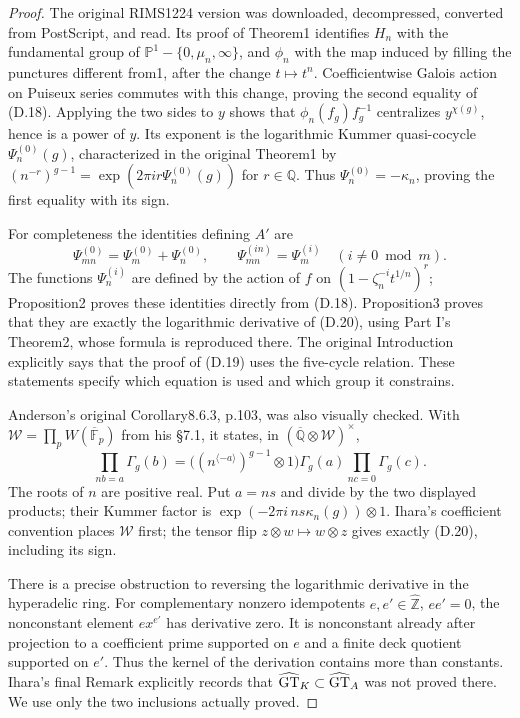 \begin{proof}
The original RIMS1224 version was downloaded, decompressed, converted from PostScript, and read. Its proof of Theorem1 identifies $H_n$ with the fundamental group of $\mathbb P^1-\{0,\mu_n,\infty\}$, and $\phi_n$ with the map induced by filling the punctures different from1, after the change $t\mapsto t^n$. Coefficientwise Galois action on Puiseux series commutes with this change, proving the second equality of (D.18). Applying the two sides to $y$ shows that $\phi_n(f_g)f_g^{-1}$ centralizes $y^{\chi(g)}$, hence is a power of $y$. Its exponent is the logarithmic Kummer quasi-cocycle $\Psi_n^{(0)}(g)$, characterized in the original Theorem1 by
$(n^{-r})^{g-1}=\exp(2\pi i r\Psi_n^{(0)}(g))$ for $r\in\mathbb Q$.
Thus $\Psi_n^{(0)}=-\kappa_n$, proving the first equality with its sign.

For completeness the identities defining $A'$ are
\[
 \Psi_{mn}^{(0)}=\Psi_m^{(0)}+\Psi_n^{(0)},\qquad
 \Psi_{mn}^{(in)}=\Psi_m^{(i)}\quad(i\ne0\bmod m).
\]
The functions $\Psi_n^{(i)}$ are defined by the action of $f$ on
$(1-\zeta_n^{-i}t^{1/n})^r$; Proposition2 proves these identities directly from (D.18). Proposition3 proves that they are exactly the logarithmic derivative of (D.20), using Part I's Theorem2, whose formula is reproduced there. The original Introduction explicitly says that the proof of (D.19) uses the five-cycle relation. These statements specify which equation is used and which group it constrains.

Anderson's original Corollary8.6.3, p.103, was also visually
checked. With $\mathcal W=\prod_pW(\overline{\mathbb F}_p)$
from his \S7.1, it states, in
$(\overline{\mathbb Q}\otimes\mathcal W)^\times$,
\[
 \prod_{nb=a}\Gamma_g(b)=
 \bigl((n^{\langle-a\rangle})^{g-1}\otimes1\bigr)
 \Gamma_g(a)\prod_{nc=0}\Gamma_g(c).
\]
The roots of $n$ are positive real. Put $a=ns$ and divide
by the two displayed products; their Kummer factor is
$\exp(-2\pi i\,ns\kappa_n(g))\otimes1$.
Ihara's coefficient convention places $\mathcal W$ first;
the tensor flip $z\otimes w\mapsto w\otimes z$ gives exactly
(D.20), including its sign.

There is a precise obstruction to reversing the logarithmic derivative in the hyperadelic ring. For complementary nonzero idempotents $e,e'\in\widehat{\mathbb Z}$, $ee'=0$, the nonconstant element $e x^{e'}$ has derivative zero. It is nonconstant already after projection to a coefficient prime supported on $e$ and a finite deck quotient supported on $e'$. Thus the kernel of the derivation contains more than constants. Ihara's final Remark explicitly records that $\widehat{\rm GT}_K\subset\widehat{\rm GT}_A$ was not proved there. We use only the two inclusions actually proved.
\end{proof}


